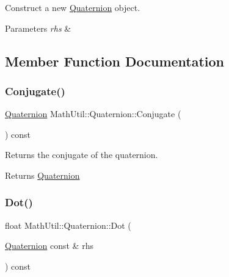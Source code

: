 Construct a new \hyperlink{structMathUtil_1_1Quaternion}{Quaternion} object. 


\begin{DoxyParams}{Parameters}
{\em rhs} & \\
\hline
\end{DoxyParams}


\subsection{Member Function Documentation}
\mbox{\label{structMathUtil_1_1Quaternion_a16e3c04798dc34eeb34d497123a15eed}} 
\subsubsection{\texorpdfstring{Conjugate()}{Conjugate()}}
{\footnotesize\ttfamily \hyperlink{structMathUtil_1_1Quaternion}{Quaternion} Math\+Util\+::\+Quaternion\+::\+Conjugate (\begin{DoxyParamCaption}{ }\end{DoxyParamCaption}) const\hspace{0.3cm}{\ttfamily [inline]}}



Returns the conjugate of the quaternion. 

\begin{DoxyReturn}{Returns}
\hyperlink{structMathUtil_1_1Quaternion}{Quaternion} 
\end{DoxyReturn}
\mbox{\label{structMathUtil_1_1Quaternion_ae213f1160bfaf3de32d1e01681ed64c0}} 
\subsubsection{\texorpdfstring{Dot()}{Dot()}}
{\footnotesize\ttfamily float Math\+Util\+::\+Quaternion\+::\+Dot (\begin{DoxyParamCaption}\item[{\hyperlink{structMathUtil_1_1Quaternion}{Quaternion} const \&}]{rhs }\end{DoxyParamCaption}) const\hspace{0.3cm}{\ttfamily [inline]}}



